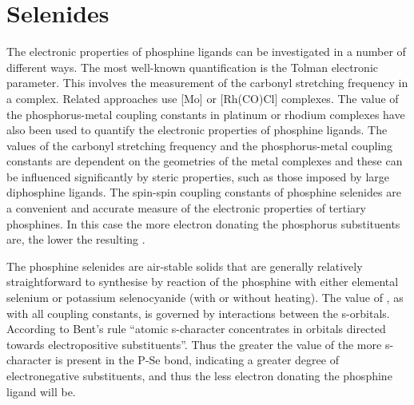 \section{Selenides}
\label{section:selenides}

The electronic properties of phosphine ligands can be investigated in a number of different ways.  The most well-known quantification is the Tolman electronic parameter.\cite{Tolman1970}  This involves the measurement of the carbonyl stretching frequency in a \ce{[Ni(CO)3L]} complex.  Related approaches use [Mo] or [Rh(CO)Cl] complexes.\cite{Roodt2003, Banger2009}  The value of the phosphorus-metal coupling constants in platinum or rhodium complexes have also been used to quantify the electronic properties of phosphine ligands.\cite{Mann1980, Pregosin2012, Roodt2003, Banger2009}  The values of the carbonyl stretching frequency and the phosphorus-metal coupling constants are dependent on the geometries of the metal complexes and these can be influenced significantly by steric properties, such as those imposed by large diphosphine ligands.  The \JPSe{} spin-spin coupling constants of phosphine selenides are a convenient and accurate measure of the electronic properties of tertiary phosphines.\cite{Beckmann2011, Muller2008c, Anderson2001} In this case the more electron donating the phosphorus substituents are, the lower the resulting \JPSe{}.  

The phosphine selenides are air-stable solids that are generally relatively straightforward to synthesise by reaction of the phosphine with either elemental selenium or potassium selenocyanide (with or without heating).\cite{Beckmann2011, Bungu2007}  The value of \JPSe{}, as with all coupling constants, is governed by interactions between the s-orbitals.  According to Bent's rule ``atomic s-character concentrates in orbitals directed towards electropositive substituents''.\cite{Bent1961}  Thus the greater the value of \JPSe{} the more s-character is present in the P-Se bond, indicating a greater degree of electronegative substituents, and thus the less electron donating the phosphine ligand will be.


